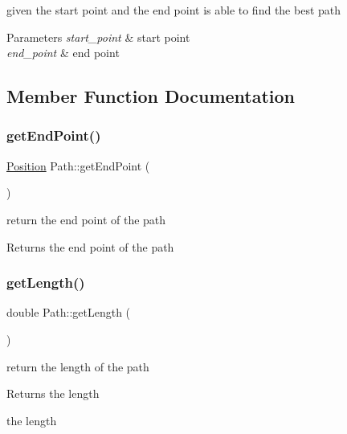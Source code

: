 given the start point and the end point is able to find the best path 


\begin{DoxyParams}{Parameters}
{\em start\+\_\+point} & start point \\
\hline
{\em end\+\_\+point} & end point \\
\hline
\end{DoxyParams}


\subsection{Member Function Documentation}
\mbox{\label{class_path_ac2617080c944b93f7c0c63f3e59aa88c}} 
\subsubsection{\texorpdfstring{get\+End\+Point()}{getEndPoint()}}
{\footnotesize\ttfamily \mbox{\hyperlink{class_position}{Position}} Path\+::get\+End\+Point (\begin{DoxyParamCaption}{ }\end{DoxyParamCaption})}



return the end point of the path 

\begin{DoxyReturn}{Returns}
the end point of the path 
\end{DoxyReturn}
\mbox{\label{class_path_ad497d2a12a47bc52a316da83dbe6acbc}} 
\subsubsection{\texorpdfstring{get\+Length()}{getLength()}}
{\footnotesize\ttfamily double Path\+::get\+Length (\begin{DoxyParamCaption}{ }\end{DoxyParamCaption})}



return the length of the path 

\begin{DoxyReturn}{Returns}
the length 

the length 
\end{DoxyReturn}
\mbox{\label{class_path_aff0072e2e1cf183ba6fc240cd85045e2}} 
